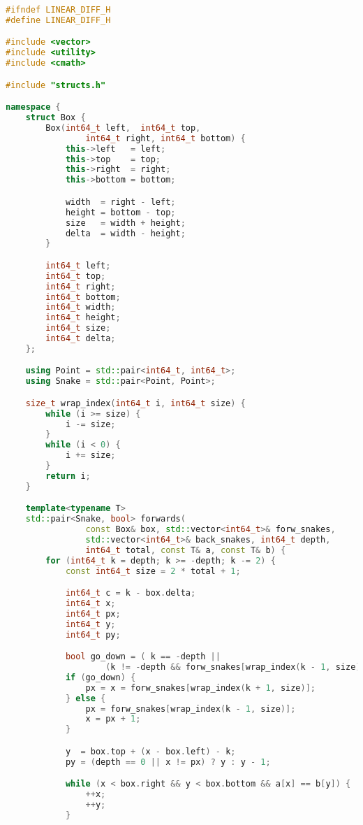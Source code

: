 \begin{lstlisting}[language=C++]
#ifndef LINEAR_DIFF_H
#define LINEAR_DIFF_H

#include <vector>
#include <utility>
#include <cmath>

#include "structs.h"

namespace {
    struct Box {
        Box(int64_t left,  int64_t top, 
                int64_t right, int64_t bottom) {
            this->left   = left;
            this->top    = top;
            this->right  = right;
            this->bottom = bottom;

            width  = right - left;
            height = bottom - top;
            size   = width + height;
            delta  = width - height;
        }

        int64_t left;
        int64_t top;
        int64_t right;
        int64_t bottom;
        int64_t width;
        int64_t height;
        int64_t size;
        int64_t delta;
    };

    using Point = std::pair<int64_t, int64_t>;
    using Snake = std::pair<Point, Point>;

    size_t wrap_index(int64_t i, int64_t size) {
        while (i >= size) {
            i -= size;
        }
        while (i < 0) {
            i += size;
        }
        return i;
    }

    template<typename T>
    std::pair<Snake, bool> forwards(
                const Box& box, std::vector<int64_t>& forw_snakes,
                std::vector<int64_t>& back_snakes, int64_t depth,
                int64_t total, const T& a, const T& b) {
        for (int64_t k = depth; k >= -depth; k -= 2) {
            const int64_t size = 2 * total + 1;

            int64_t c = k - box.delta;
            int64_t x; 
            int64_t px;
            int64_t y;
            int64_t py;

            bool go_down = ( k == -depth || 
                    (k != -depth && forw_snakes[wrap_index(k - 1, size)] < forw_snakes[wrap_index(k + 1, size)]) );
            if (go_down) {
                px = x = forw_snakes[wrap_index(k + 1, size)];
            } else {
                px = forw_snakes[wrap_index(k - 1, size)];
                x = px + 1;
            }

            y  = box.top + (x - box.left) - k;
            py = (depth == 0 || x != px) ? y : y - 1;

            while (x < box.right && y < box.bottom && a[x] == b[y]) {
                ++x;
                ++y;
            }


\end{lstlisting}
